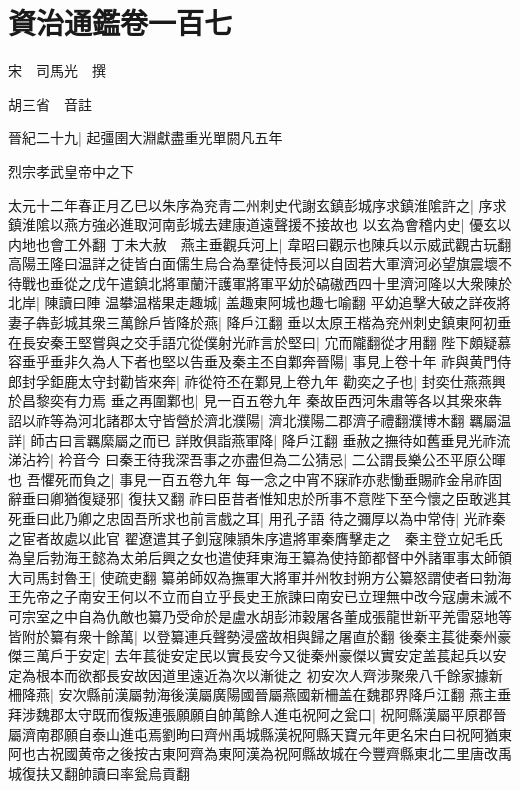 \chapter{資治通鑑卷一百七}
宋　司馬光　撰

胡三省　音註

晉紀二十九|{
	起彊圉大淵獻盡重光單閼凡五年}


烈宗孝武皇帝中之下

太元十二年春正月乙巳以朱序為兖青二州刺史代謝玄鎮彭城序求鎮淮隂許之|{
	序求鎮淮隂以燕方強必進取河南彭城去建康道遠聲援不接故也}
以玄為會稽内史|{
	優玄以内地也會工外翻}
丁未大赦　燕主垂觀兵河上|{
	韋昭曰觀示也陳兵以示威武觀古玩翻}
高陽王隆曰温詳之徒皆白面儒生烏合為羣徒恃長河以自固若大軍濟河必望旗震壞不待戰也垂從之戊午遣鎮北將軍蘭汗護軍將軍平幼於碻磝西四十里濟河隆以大衆陳於北岸|{
	陳讀曰陣}
温攀温楷果走趣城|{
	盖趣東阿城也趣七喻翻}
平幼追擊大破之詳夜將妻子犇彭城其衆三萬餘戶皆降於燕|{
	降戶江翻}
垂以太原王楷為兖州刺史鎮東阿初垂在長安秦王堅嘗與之交手語宂從僕射光祚言於堅曰|{
	宂而隴翻從才用翻}
陛下頗疑慕容垂乎垂非久為人下者也堅以告垂及秦主丕自鄴奔晉陽|{
	事見上卷十年}
祚與黄門侍郎封孚鉅鹿太守封勸皆來奔|{
	祚從符丕在鄴見上卷九年}
勸奕之子也|{
	封奕仕燕燕興於昌黎奕有力焉}
垂之再圍鄴也|{
	見一百五卷九年}
秦故臣西河朱肅等各以其衆來犇詔以祚等為河北諸郡太守皆營於濟北濮陽|{
	濟北濮陽二郡濟子禮翻濮博木翻}
羈屬温詳|{
	師古曰言羈縻屬之而已}
詳敗俱詣燕軍降|{
	降戶江翻}
垂赦之撫待如舊垂見光祚流涕沾衿|{
	衿音今}
曰秦王待我深吾事之亦盡但為二公猜忌|{
	二公謂長樂公丕平原公暉也}
吾懼死而負之|{
	事見一百五卷九年}
每一念之中宵不寐祚亦悲慟垂賜祚金帛祚固辭垂曰卿猶復疑邪|{
	復扶又翻}
祚曰臣昔者惟知忠於所事不意陛下至今懷之臣敢逃其死垂曰此乃卿之忠固吾所求也前言戲之耳|{
	用孔子語}
待之彌厚以為中常侍|{
	光祚秦之宦者故處以此官}
翟遼遣其子釗寇陳頴朱序遣將軍秦膺擊走之　秦主登立妃毛氏為皇后勃海王懿為太弟后興之女也遣使拜東海王纂為使持節都督中外諸軍事太師領大司馬封魯王|{
	使疏吏翻}
纂弟師奴為撫軍大將軍并州牧封朔方公纂怒謂使者曰勃海王先帝之子南安王何以不立而自立乎長史王旅諫曰南安已立理無中改今寇虜未滅不可宗室之中自為仇敵也纂乃受命於是盧水胡彭沛穀屠各董成張龍世新平羌雷惡地等皆附於纂有衆十餘萬|{
	以登纂連兵聲勢浸盛故相與歸之屠直於翻}
後秦主萇徙秦州豪傑三萬戶于安定|{
	去年萇徙安定民以實長安今又徙秦州豪傑以實安定盖萇起兵以安定為根本而欲都長安故因道里遠近為次以漸徙之}
初安次人齊涉聚衆八千餘家據新柵降燕|{
	安次縣前漢屬勃海後漢屬廣陽國晉屬燕國新柵盖在魏郡界降戶江翻}
燕主垂拜涉魏郡太守既而復叛連張願願自帥萬餘人進屯祝阿之瓮口|{
	祝阿縣漢屬平原郡晉屬濟南郡願自泰山進屯焉劉昫曰齊州禹城縣漢祝阿縣天寶元年更名宋白曰祝阿猶東阿也古祝國黄帝之後按古東阿齊為東阿漢為祝阿縣故城在今豐齊縣東北二里唐改禹城復扶又翻帥讀曰率瓮烏貢翻}
